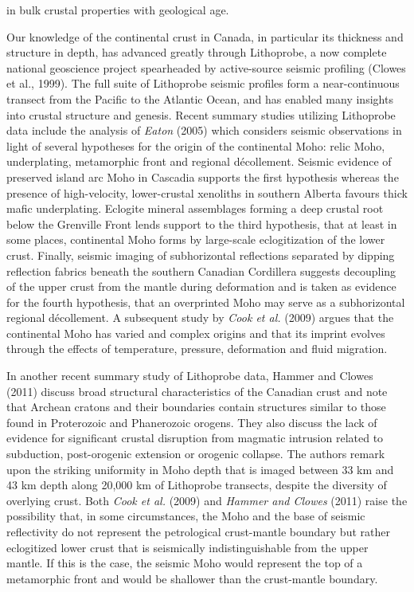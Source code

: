 \documentclass[review]{elsarticle}
\begin{document}
in bulk crustal properties with geological age.

Our knowledge of the continental crust in Canada, in particular its thickness and structure in depth, has advanced greatly through Lithoprobe, a now complete national geoscience project spearheaded by active-source seismic profiling (Clowes et al., 1999). The full suite of Lithoprobe seismic profiles form a near-continuous transect from the Pacific to the Atlantic Ocean, and has enabled many insights into crustal structure and genesis. Recent summary studies utilizing Lithoprobe data include the analysis of {\it Eaton} (2005) which considers seismic observations in light of several hypotheses for the origin of the continental Moho: relic Moho, underplating, metamorphic front and regional d\'{e}collement. Seismic evidence of preserved island arc Moho in Cascadia supports the first hypothesis whereas the presence of high-velocity, lower-crustal xenoliths in southern Alberta favours thick mafic underplating. Eclogite mineral assemblages forming a deep crustal root below the Grenville Front lends support to the third hypothesis, that at least in some places, continental Moho forms by large-scale eclogitization of the lower crust. Finally, seismic imaging of subhorizontal reflections separated by dipping reflection fabrics beneath the southern Canadian Cordillera suggests decoupling of the upper crust from the mantle during deformation and is taken as evidence for the fourth hypothesis, that an overprinted Moho may serve as a subhorizontal regional d\'ecollement. A subsequent study by {\it Cook et al.} (2009) argues that the continental Moho has varied and complex origins and that its imprint evolves through the effects of temperature, pressure, deformation and fluid migration.

In another recent summary study of Lithoprobe data, Hammer and Clowes (2011) discuss broad structural characteristics of the Canadian crust and note that Archean cratons and their boundaries contain structures similar to those found in Proterozoic and Phanerozoic orogens. They also discuss the lack of evidence for significant crustal disruption from magmatic intrusion related to subduction, post-orogenic extension or orogenic collapse. The authors remark upon the striking uniformity in Moho depth that is imaged between 33 km and 43 km depth along 20,000 km of Lithoprobe transects, despite the diversity of overlying crust. Both {\it Cook et al.} (2009) and {\it Hammer and Clowes} (2011) raise the possibility that, in some circumstances, the Moho and the base of seismic reflectivity do not represent the petrological crust-mantle boundary but rather eclogitized lower crust that is seismically indistinguishable from the upper mantle. If this is the case, the seismic Moho would represent the top of a metamorphic front and would be shallower than the crust-mantle boundary.
\end{document}
